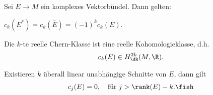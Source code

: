\documentclass[%
	paper=a5,%
	fleqn,%
	DIV=18,%
	BCOR=0mm,
	fontsize=11pt,
	titlepage=false,%
	bibliography=totoc,
	DIV=18,%
	twoside=true,
	pdftitle=Riemannsche Geometrie,
	pdfauthor=Uwe Semmelmann,
	numbers=noendperiod]%
	{scrbook}
\begin{document}
\begin{lem}
Sei $E\to M$ ein komplexes Vektorbündel. Dann gelten:
\begin{propenum}
\item $c_{k}(E^*) = c_{k}(\bar{E}) = (-1)^k c_{k}(E)$.
\item Die $k$-te reelle Chern-Klasse ist eine reelle Kohomologieklasse, d.h.
\begin{align*}
c_{k}(E) \in H_{\dR}^{2k}(M,\R).
\end{align*}
\item Existieren $k$ überall linear unabhängige Schnitte von $E$, dann gilt
\begin{align*}
c_{j}(E) = 0,\quad \text{für } j > \rank(E)-k.\fish
\end{align*}
\end{propenum}
\end{lem}
\end{document}
